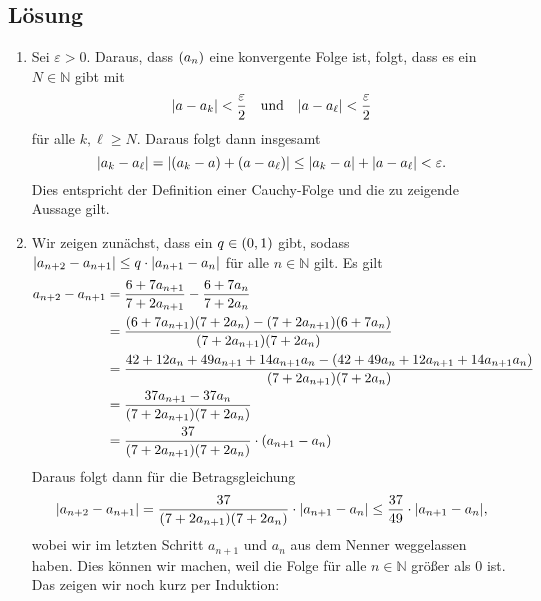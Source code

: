 \documentclass[german,12pt]{homework}
\newcommand{\NN}{\mathbb{N}}
\DeclarePairedDelimiter{\absolute}{\lvert}{\rvert}
\DeclarePairedDelimiter{\enbrace}{(}{)}
\begin{document}
    \subsection*{Lösung}
    \begin{enumerate}
        \item Sei \(\varepsilon > 0\). Daraus, dass \(\enbrace*{a_n}\) eine
        konvergente Folge ist, folgt, dass es ein \(N \in \NN\) gibt mit
        \[\absolute*{a - a_k} < \frac{\varepsilon}{2} \quad \text{und} \quad
        \absolute*{a - a_\ell} < \frac{\varepsilon}{2}\]
        für alle \(k, \ell \ge N\). Daraus folgt dann insgesamt
        \[\absolute*{a_k - a_\ell} = \absolute*{\enbrace*{a_k - a} +
        \enbrace*{a - a_\ell}} \le \absolute*{a_k - a} + \absolute*{a - a_\ell}
        < \varepsilon.\]
        Dies entspricht der Definition einer Cauchy-Folge und die zu zeigende
        Aussage gilt.
        \item Wir zeigen zunächst, dass ein \(q \in \enbrace*{0, 1}\) gibt,
        sodass \(\absolute*{a_{n + 2} - a_{n + 1}} \le q \cdot \absolute*{a_{n
        + 1} - a_n}\) für alle \(n \in \NN\) gilt. Es gilt
        \begin{align*}
            a_{n + 2} - a_{n + 1} &= \frac{6 + 7a_{n + 1}}{7 + 2a_{n + 1}} -
            \frac{6 + 7a_n}{7 + 2a_n}\\
            &= \frac{\enbrace*{6 + 7a_{n + 1}}\enbrace*{7 + 2a_n} - \enbrace*{7
            + 2a_{n + 1}}\enbrace*{6 + 7a_n}}{\enbrace*{7 + 2a_{n +
            1}}\enbrace*{7 + 2a_n}}\\
            &= \frac{42 + 12a_n + 49a_{n + 1} + 14a_{n + 1}a_n - \enbrace*{42 +
            49a_n + 12a_{n + 1} + 14a_{n + 1}a_n}}{\enbrace*{7 + 2a_{n +
            1}}\enbrace*{7 + 2a_n}}\\
            &= \frac{37a_{n + 1} - 37a_n}{\enbrace*{7 + 2a_{n + 1}}\enbrace*{7
            + 2a_n}}\\
            &= \frac{37}{\enbrace*{7 + 2a_{n + 1}}\enbrace*{7 + 2a_n}} \cdot
            \enbrace*{a_{n + 1} - a_n}
        \end{align*}
        Daraus folgt dann für die Betragsgleichung
        \[\absolute*{a_{n + 2}- a_{n + 1}} = \frac{37}{\enbrace*{7 + 2a_{n +
        1}}\enbrace*{7 + 2a_n}} \cdot \absolute*{a_{n + 1} - a_n} \le
        \frac{37}{49} \cdot \absolute*{a_{n + 1} - a_n},\]
        wobei wir im letzten Schritt \(a_{n + 1}\) und \(a_n\) aus dem Nenner
        weggelassen haben. Dies können wir machen, weil die Folge für alle \(n
        \in \NN\) größer als \(0\) ist. Das zeigen wir noch kurz per Induktion:

\end{enumerate}
\end{document}
